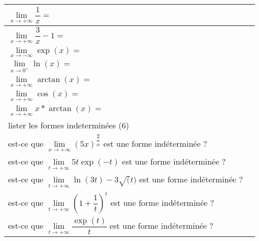 \documentclass{article}
\begin{document}
\renewcommand{\arraystretch}{3}

\begin{tabular}{|p{4cm}|p{12cm}|}
\hline $\lim\limits_{x \rightarrow +\infty} \dfrac{1}{x} = $ & \\
\hline $\lim\limits_{x \rightarrow +\infty} \dfrac{3}{x} - 1= $ & \\
\hline $\lim\limits_{x \rightarrow -\infty} \exp(x) = $ & \\
\hline $\lim\limits_{x \rightarrow 0^+} \ln(x) = $ & \\
\hline $\lim\limits_{x \rightarrow +\infty} \arctan(x) =$ & \\
\hline $\lim\limits_{x \rightarrow +\infty} \cos(x) =$ & \\
\hline $\lim\limits_{x \rightarrow +\infty} x*\arctan(x) =$ & \\
\hline lister les formes indeterminées (6) & \\
\hline est-ce que $\lim\limits_{x \rightarrow +\infty}(5x)^{\dfrac{2}{x}}$ est une forme indéterminée ? & \\
 \hline est-ce que $\lim\limits_{t \rightarrow +\infty}5t\exp(-t) $ est une forme indéterminée ? & \\
 \hline est-ce que $\lim\limits_{t \rightarrow +\infty}\ln(3t) - 3\sqrt(t) $ est une forme indéterminée ? & \\
 \hline est-ce que $\lim\limits_{t \rightarrow +\infty}(1+\dfrac{1}{t})^t $ est une forme indéterminée ? & \\
 \hline est-ce que $\lim\limits_{t \rightarrow +\infty}\dfrac{\exp(t)}{t} $ est une forme indéterminée ? & \\
 \hline\end{tabular}
\end{document}

